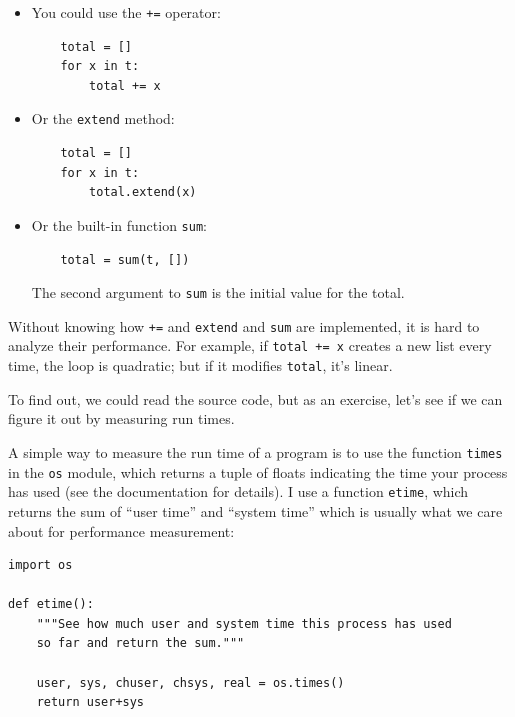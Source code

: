 \documentclass[10pt]{book}
\begin{document}
\begin{itemize}

\item You could use the {\tt +=} operator:

\begin{verbatim}
    total = []
    for x in t:
        total += x
\end{verbatim}

\item Or the {\tt extend} method:

\begin{verbatim}
    total = []
    for x in t:
        total.extend(x)
\end{verbatim}

\item Or the built-in function {\tt sum}:

\begin{verbatim}
    total = sum(t, [])
\end{verbatim}

The second argument to {\tt sum} is the initial value for the total.

\end{itemize}

Without knowing how {\tt +=} and {\tt extend} and {\tt sum} are
implemented, it is hard to analyze their performance.  For example,
if {\tt total += x} creates a new list every time, the loop
is quadratic; but if it modifies {\tt total}, it's linear.

To find out, we could read the source code, but as an exercise, let's see
if we can figure it out by measuring run times.

A simple way to measure the run time of a program is to use
the function {\tt times} in the {\tt os} module, which returns
a tuple of floats indicating the time your process has used
(see the documentation for details).  I use a function {\tt etime},
which returns the sum of ``user time'' and ``system time'' which
is usually what we care about for performance measurement:

\begin{verbatim}
import os

def etime():
    """See how much user and system time this process has used
    so far and return the sum."""

    user, sys, chuser, chsys, real = os.times()
    return user+sys
\end{verbatim}
\end{document}
